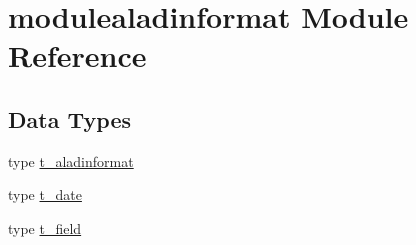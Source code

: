 \hypertarget{namespacemodulealadinformat}{}\section{modulealadinformat Module Reference}
\label{namespacemodulealadinformat}
\subsection*{Data Types}
\begin{DoxyCompactItemize}
\item 
type \mbox{\hyperlink{structmodulealadinformat_1_1t__aladinformat}{t\+\_\+aladinformat}}
\item 
type \mbox{\hyperlink{structmodulealadinformat_1_1t__date}{t\+\_\+date}}
\item 
type \mbox{\hyperlink{structmodulealadinformat_1_1t__field}{t\+\_\+field}}
\end{DoxyCompactItemize}

